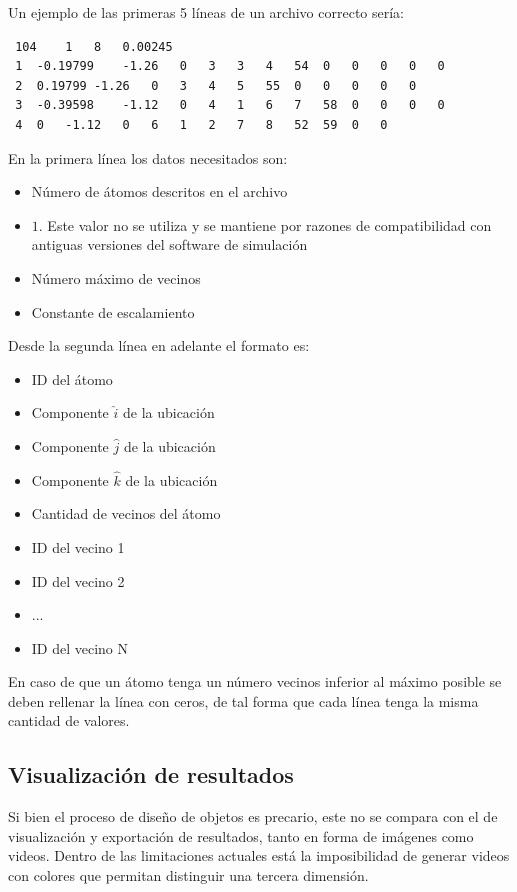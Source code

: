 Un ejemplo de las primeras 5 líneas de un archivo correcto sería:

\begin{center}
	\begin{lstlisting}
 104	1	8	0.00245
 1	-0.19799	-1.26	0	3	3	4	54	0	0	0	0	0
 2	0.19799	-1.26	0	3	4	5	55	0	0	0	0	0
 3	-0.39598	-1.12	0	4	1	6	7	58	0	0	0	0
 4	0	-1.12	0	6	1	2	7	8	52	59	0	0
	\end{lstlisting}
\end{center}

En la primera línea los datos necesitados son:
\label{formatoDatos}

\begin{itemize}
	\item Número de átomos descritos en el archivo
	\item $1$. Este valor no se utiliza y se mantiene por razones de compatibilidad con antiguas versiones del software de simulación
	\item Número máximo de vecinos
	\item Constante de escalamiento
\end{itemize}

Desde la segunda línea en adelante el formato es:

\begin{itemize}
	\item ID del átomo
	\item Componente $\hat{i}$ de la ubicación
	\item Componente $\hat{j}$ de la ubicación
	\item Componente $\hat{k}$ de la ubicación
	\item Cantidad de vecinos del átomo
	\item ID del vecino 1
	\item ID del vecino 2
	\item ...
	\item ID del vecino N
\end{itemize}

En caso de que un átomo tenga un número vecinos inferior al máximo posible se deben rellenar la línea con ceros, de tal forma que cada línea tenga la misma cantidad de valores.

\subsection{Visualización de resultados}

Si bien el proceso de diseño de objetos es precario, este no se compara con el de visualización y exportación de resultados, tanto en forma de imágenes como videos. Dentro de las limitaciones actuales está la imposibilidad de generar videos con colores que permitan distinguir una tercera dimensión.

